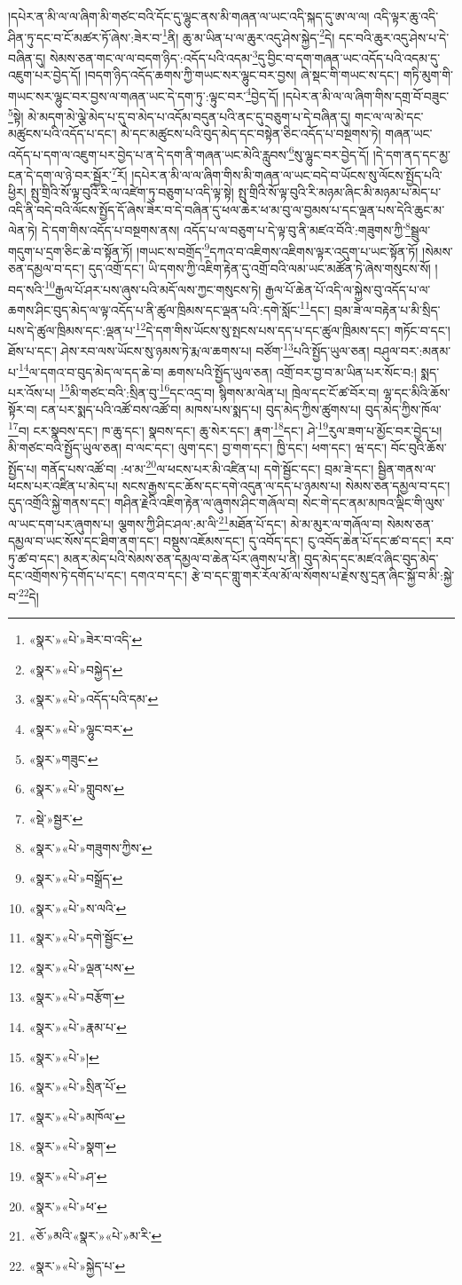 །དཔེར་ན་མི་ལ་ལ་ཞིག་མི་གཙང་བའི་དོང་དུ་ལྷུང་ནས་མི་གཞན་ལ་ཡང་འདི་སྐད་དུ་ཨ་ལ་ལ། འདི་ལྟར་ཆུ་འདི་ཤིན་ཏུ་དང་བ་ངོ་མཚར་ཏོ་ཞེས་:ཟེར་བ་\footnote{«སྣར་»«པེ་»ཟེར་བ་འདི་}ནི། ཆུ་མ་ཡིན་པ་ལ་ཆུར་འདུ་ཤེས་སྐྱེད་\footnote{«སྣར་»«པེ་»བསྐྱེད་}དེ། དང་བའི་ཆུར་འདུ་ཤེས་པ་དེ་བཞིན་དུ། སེམས་ཅན་གང་ལ་ལ་བདག་ཉིད་:འདོད་པའི་འདམ་\footnote{«སྣར་»«པེ་»འདོད་པའི་དམ་}དུ་བྱིང་བ་དག་གཞན་ཡང་འདོད་པའི་འདམ་དུ་འཇུག་པར་བྱེད་དོ། །བདག་ཉིད་འདོད་ཆགས་ཀྱི་གཡང་སར་ལྷུང་བར་བྱས། ཞེ་སྡང་གི་གཡང་ས་དང་། གཏི་མུག་གི་གཡང་སར་ལྷུང་བར་བྱས་ལ་གཞན་ཡང་དེ་དག་ཏུ་:ལྟུང་བར་\footnote{«སྣར་»«པེ་»ལྷུང་བར་}བྱེད་དོ། །དཔེར་ན་མི་ལ་ལ་ཞིག་གིས་དགྲ་བོ་བཟུང་\footnote{«སྣར་»གཟུང་}སྟེ། མེ་མདག་མེ་ལྕེ་མེད་པ་དུ་བ་མེད་པ་འདོམ་བདུན་པའི་ནང་དུ་བཅུག་པ་དེ་བཞིན་དུ། གང་ལ་ལ་མེ་དང་མཚུངས་པའི་འདོད་པ་དང་། མེ་དང་མཚུངས་པའི་བུད་མེད་དང་བསྟེན་ཅིང་འདོད་པ་བསྔགས་ཏེ། གཞན་ཡང་འདོད་པ་དག་ལ་འཇུག་པར་བྱེད་པ་ན་དེ་དག་ནི་གཞན་ཡང་མེའི་རླུབས་\footnote{«སྣར་»«པེ་»གླུབས་}སུ་ལྷུང་བར་བྱེད་དོ། །དེ་དག་ནད་དང་མྱ་ངན་དེ་དག་ལ་ཉེ་བར་སྦྱོར་\footnote{«སྡེ་»སྦྱར་}རོ། །དཔེར་ན་མི་ལ་ལ་ཞིག་གིས་མི་གཞན་ལ་ཡང་བདེ་བ་ཡོངས་སུ་ལོངས་སྤྱོད་པའི་ཕྱིར། སྤུ་གྲིའི་སོ་ལྟ་བུའི་རི་ལ་འཛེག་ཏུ་བཅུག་པ་འདི་ལྟ་སྟེ། སྤུ་གྲིའི་སོ་ལྟ་བུའི་རི་མཉམ་ཞིང་མི་མཉམ་པ་མེད་པ་འདི་ནི་བདེ་བའི་ལོངས་སྤྱོད་དོ་ཞེས་ཟེར་བ་དེ་བཞིན་དུ་ཕལ་ཆེར་ཕ་མ་བུ་ལ་བྱམས་པ་དང་ལྡན་པས་དེའི་ཆུང་མ་ལེན་ཏེ། དེ་དག་གིས་འདོད་པ་བསྔགས་ནས། འདོད་པ་ལ་བཅུག་པ་དེ་ལྟ་བུ་ནི་མཛའ་བོའི་:གཟུགས་ཀྱི་\footnote{«སྣར་»«པེ་»གཟུགས་ཀྱིས་}སྦྲུལ་གདུག་པ་དྲག་ཅིང་ཆེ་བ་སྟོན་ཏོ། །གཡང་ས་བགྲོད་\footnote{«སྣར་»«པེ་»བསྒྲོད་}དཀའ་བ་འཇིགས་འཇིགས་ལྟར་འདུག་པ་ཡང་སྟོན་ཏོ། །སེམས་ཅན་དམྱལ་བ་དང་། དུད་འགྲོ་དང་། ཡི་དགས་ཀྱི་འཇིག་རྟེན་དུ་འགྲོ་བའི་ལམ་ཡང་མཚོན་ཏེ་ཞེས་གསུངས་སོ། །བད་སའི་\footnote{«སྣར་»«པེ་»ས་ལའི་}རྒྱལ་པོ་ཤར་པས་ཞུས་པའི་མདོ་ལས་ཀྱང་གསུངས་ཏེ། རྒྱལ་པོ་ཆེན་པོ་འདི་ལ་སྐྱེས་བུ་འདོད་པ་ལ་ཆགས་ཤིང་བུད་མེད་ལ་ལྟ་འདོད་པ་ནི་ཚུལ་ཁྲིམས་དང་ལྡན་པའི་:དགེ་སློང་\footnote{«སྣར་»«པེ་»དགེ་སྦྱོང་}དང་། བྲམ་ཟེ་ལ་བརྟེན་པ་མི་སྲིད་པས་དེ་ཚུལ་ཁྲིམས་དང་:ལྡན་པ་\footnote{«སྣར་»«པེ་»ལྡན་པས་}དེ་དག་གིས་ཡོངས་སུ་སྤངས་པས་དད་པ་དང་ཚུལ་ཁྲིམས་དང་། གཏོང་བ་དང་། ཐོས་པ་དང་། ཤེས་རབ་ལས་ཡོངས་སུ་ཉམས་ཏེ་རྨ་ལ་ཆགས་པ། བཙོག་\footnote{«སྣར་»«པེ་»བརྩོག་}པའི་སྤྱོད་ཡུལ་ཅན། བཤུལ་བར་:མནམ་པ་\footnote{«སྣར་»«པེ་»རྣམ་པ་}ལ་དགའ་བ་བུད་མེད་ལ་དད་ཆེ་བ། ཆགས་པའི་སྤྱོད་ཡུལ་ཅན། འགྲོ་བར་བྱ་བ་མ་ཡིན་པར་སོང་བ:། སྨད་པར་འོས་པ། \footnote{«སྣར་»«པེ་»།  }མི་གཙང་བའི་:སྲིན་བུ་\footnote{«སྣར་»«པེ་»སྲིན་པོ་}དང་འདྲ་བ། སྙིགས་མ་ལེན་པ། ཁྲེལ་དང་ངོ་ཚ་བོར་བ། ལྷ་དང་མིའི་ཆོས་སྟོར་བ། ངན་པར་སྨད་པའི་འཚོ་བས་འཚོ་བ། མཁས་པས་སྨད་པ། བུད་མེད་ཀྱིས་ཚུགས་པ། བུད་མེད་ཀྱིས་ཁོལ་\footnote{«སྣར་»«པེ་»མཁོལ་}བ། ངར་སྣབས་དང་། ཁ་ཆུ་དང་། སྣབས་དང་། ཆུ་སེར་དང་། རྣག་\footnote{«སྣར་»«པེ་»སྣག་}དང་། ཤེ་\footnote{«སྣར་»«པེ་»ཤ་}རུལ་ཟག་པ་མྱོང་བར་བྱེད་པ། མི་གཙང་བའི་སྤྱོད་ཡུལ་ཅན། བ་ལང་དང་། ལུག་དང་། བྱ་གག་དང་། ཁྱི་དང་། ཕག་དང་། ཝ་དང་། བོང་བུའི་ཆོས་སྤྱོད་པ། གནོད་པས་འཚོ་བ། :ཕ་མ་\footnote{«སྣར་»«པེ་»ཕ་}ལ་ཕངས་པར་མི་འཛིན་པ། དགེ་སྦྱོང་དང་། བྲམ་ཟེ་དང་། སྦྱིན་གནས་ལ་ཕངས་པར་འཛིན་པ་མེད་པ། སངས་རྒྱས་དང་ཆོས་དང་དགེ་འདུན་ལ་དད་པ་ཉམས་པ། སེམས་ཅན་དམྱལ་བ་དང་། དུད་འགྲོའི་སྐྱེ་གནས་དང་། གཤིན་རྗེའི་འཇིག་རྟེན་ལ་ཞུགས་ཤིང་གཞོལ་བ། སེང་གེ་དང་ནམ་མཁའ་ལྡིང་གི་ལུས་ལ་ཡང་དག་པར་ཞུགས་པ། ལྕགས་ཀྱི་ཤིང་ཤལ་:མ་ལི་\footnote{«ཅོ་»མའི་«སྣར་»«པེ་»མ་རི་}མཐོན་པོ་དང་། མེ་མ་མུར་ལ་གཞོལ་བ། སེམས་ཅན་དམྱལ་བ་ཡང་སོས་དང་ཐིག་ནག་དང་། བསྡུས་འཇོམས་དང་། དུ་འབོད་དང་། ངུ་འབོད་ཆེན་པོ་དང་ཚ་བ་དང་། རབ་ཏུ་ཚ་བ་དང་། མནར་མེད་པའི་སེམས་ཅན་དམྱལ་བ་ཆེན་པོར་ཞུགས་པ་ནི། བུད་མེད་དང་མཛའ་ཞིང་བུད་མེད་དང་འགྲོགས་ཏེ་དགོད་པ་དང་། དགའ་བ་དང་། རྩེ་བ་དང་གླུ་གར་རོལ་མོ་ལ་སོགས་པ་རྗེས་སུ་དྲན་ཞིང་སྐྱོ་བ་མི་:སྐྱེ་བ་\footnote{«སྣར་»«པེ་»སྐྱེད་པ་}དེ། 